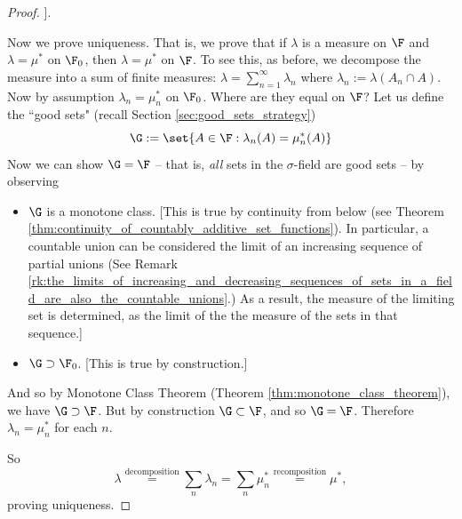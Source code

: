 \documentclass{article} %
\begin{document}
\begin{proof}
{]. }


Now we prove uniqueness.   That is, we prove that if $\lambda$ is a measure on $\F$ and $\lambda = \mu^*$ on $\F_0$, then $\lambda = \mu^*$ on $\F$.    To see this, as before, we decompose the measure into a sum of finite measures: $\lambda = \sum_{n=1}^\infty \lambda_n$ where $\lambda_n := \lambda (A_n \cap A)$.  Now by assumption $\lambda_n = \mu_n^*$ on $\F_0$.  Where are they equal on $\F$?  Let us define the ``good sets" (recall Section \ref{sec:good_sets_strategy})
\[ \G : = \set{A \in \F : \lambda_n (A) = \mu_n^* (A)} \]
Now we can show $\G = \F$ -- that is, \textit{all} sets in the $\sigma$-field are good sets -- by observing
\begin{itemize} 
\item 	 $\G$ is a monotone class.  {\footnotesize 
[This is true by continuity from below (see Theorem \ref{thm:continuity_of_countably_additive_set_functions}). In particular, a countable union can be considered the limit of an increasing sequence of partial unions (See Remark \ref{rk:the_limits_of_increasing_and_decreasing_sequences_of_sets_in_a_field_are_also_the_countable_unions}.) As a result, the measure of the limiting set is determined, as the limit of the the measure of the sets in that sequence.] }
\item $\G \supset \F_0$. {\footnotesize 
[This is true by construction.] }
\end{itemize} 
And so by Monotone Class Theorem (Theorem \ref{thm:monotone_class_theorem}), we have $\G \supset \F$.  But by construction $\G \subset \F$, and so $\G = \F$.  Therefore $\lambda_n = \mu_n^*$ for each $n$.  

So 
\[ \lambda \stackrel{\text{decomposition}}{=} \sum_n \lambda_n = \sum_n \mu_n^* \stackrel{\text{recomposition}}{=} \mu^*, \] proving uniqueness.
\end{proof}
\end{document}
